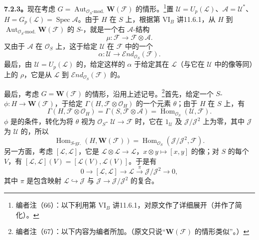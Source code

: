 \textbf{7.2.3。}现在考虑 $G=\operatorname{Aut}_{\mathcal O_S\text{-mod.}}\mathbf W(\mathcal F)$ 的情形。\footnote{编者注（66）：以下利用第 VI$_B$ 讲11.6.1，对原文作了详细展开（并作了简化）。}置 $\mathcal U=U_p(\mathcal L)$、$\mathcal A=\mathcal U^*$、$H=G_p(\mathcal L)=\operatorname{Spec}\mathcal A$。由于 $H$ 在 $S$ 上，根据第 VI$_B$ 讲11.6.1，从 $H$ 到 $\operatorname{Aut}_{\mathcal O_S\text{-mod.}}\mathbf W(\mathcal F)$ 的 $S$-，就是一个右 $\mathcal A$-结构
\[
 \mu:\mathcal F\longrightarrow\mathcal F\otimes\mathcal A.
\]
又由于 $\mathcal A$ 在 $\mathcal O_S$ 上，这于给定 $\mathcal U$ 在 $\mathcal F$ 中的一个
\[
 \alpha:\mathcal U\longrightarrow\mathcal End_{\mathcal O_S}(\mathcal F).
\]
最后，由 $\mathcal U=U_p(\mathcal L)$ 的，给定这样的 $\alpha$ 于给定其在 $\mathcal L$（与它在 $\mathcal U$ 中的像等同）上的 $\rho$，它是从 $\mathcal L$ 到 $\mathcal End_{\mathcal O_S}(\mathcal F)$ 的。

最后，考虑 $G=\mathbf W(\mathcal F)$ 的情形，沿用上述记号。\footnote{编者注（67）：以下内容为编者所加。（原文只说“$\mathbf W(\mathcal F)$ 的情形类似”。）}首先，给定一个 $S$- $\phi:H\to\mathbf W(\mathcal F)$，于给定 $\Gamma(H,\mathcal F\otimes\mathcal O_H)$ 的一个元素 $\theta$；由于 $H$ 在 $S$ 上，有
\[
 \Gamma(H,\mathcal F\otimes\mathcal O_H)=\Gamma(S,\mathcal F\otimes\mathcal A)
 =\operatorname{Hom}_{\mathcal O_S}(\mathcal U,\mathcal F).
\]
$\phi$ 是的条件，转化为将 $\theta$ 视为 $\mathcal O_S$- $\mathcal U\to\mathcal F$ 时，它在 $1_{\mathcal U}$ 及 $\mathcal J/\mathcal J^2$ 上为零，其中 $\mathcal J$ 为 $\mathcal U$ 的，所以
\[
 \operatorname{Hom}_{S\text{-gr.}}(H,\mathbf W(\mathcal F))
 =\operatorname{Hom}_{\mathcal O_S}(\mathcal J/\mathcal J^2,\mathcal F).\tag{1}
\]
另一方面，考虑 $[\mathcal L,\mathcal L]$，它是 $\mathcal L\otimes\mathcal L\to\mathcal L$，$x\otimes y\mapsto[x,y]$ 的像；对 $S$ 的每个 $V$，有
$[\mathcal L,\mathcal L](V)=[\mathcal L(V),\mathcal L(V)]$。于是有
\[
 0\longrightarrow[\mathcal L,\mathcal L]\longrightarrow\mathcal L
 \xrightarrow{\pi}\mathcal J/\mathcal J^2\longrightarrow0,\tag{$\dagger$}
\]
其中 $\pi$ 是包含映射 $\mathcal L\hookrightarrow\mathcal J$ 与 $\mathcal J\to\mathcal J/\mathcal J^2$ 的复合。

